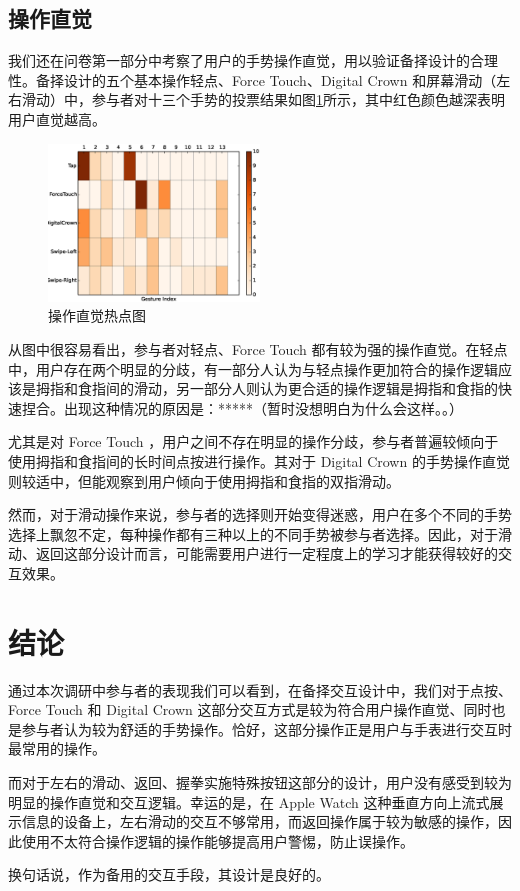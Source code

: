 \subsection{操作直觉}

我们还在问卷第一部分中考察了用户的手势操作直觉，用以验证备择设计的合理性。备择设计的五个基本操作轻点、Force Touch、Digital Crown 和屏幕滑动（左右滑动）中，参与者对十三个手势的投票结果如图\ref{fig:heat}所示，其中红色颜色越深表明用户直觉越高。

\begin{figure}[H]
    \kaishu
    \centering
    \includegraphics[width=0.5\textwidth]{figures/heat}
    \caption{\kaishu 操作直觉热点图}
    \label{fig:heat}
\end{figure}

从图中很容易看出，参与者对轻点、Force Touch 都有较为强的操作直觉。在轻点中，用户存在两个明显的分歧，有一部分人认为与轻点操作更加符合的操作逻辑应该是拇指和食指间的滑动，另一部分人则认为更合适的操作逻辑是拇指和食指的快速捏合。出现这种情况的原因是：*****（暂时没想明白为什么会这样。。）

尤其是对 Force Touch ，用户之间不存在明显的操作分歧，参与者普遍较倾向于使用拇指和食指间的长时间点按进行操作。其对于 Digital Crown 的手势操作直觉则较适中，但能观察到用户倾向于使用拇指和食指的双指滑动。

然而，对于滑动操作来说，参与者的选择则开始变得迷惑，用户在多个不同的手势选择上飘忽不定，每种操作都有三种以上的不同手势被参与者选择。因此，对于滑动、返回这部分设计而言，可能需要用户进行一定程度上的学习才能获得较好的交互效果。

\section{结论}

通过本次调研中参与者的表现我们可以看到，在备择交互设计中，我们对于点按、Force Touch 和 Digital Crown 这部分交互方式是较为符合用户操作直觉、同时也是参与者认为较为舒适的手势操作。恰好，这部分操作正是用户与手表进行交互时最常用的操作。

而对于左右的滑动、返回、握拳实施特殊按钮这部分的设计，用户没有感受到较为明显的操作直觉和交互逻辑。幸运的是，在 Apple Watch 这种垂直方向上流式展示信息的设备上，左右滑动的交互不够常用，而返回操作属于较为敏感的操作，因此使用不太符合操作逻辑的操作能够提高用户警惕，防止误操作。

换句话说，作为备用的交互手段，其设计是良好的。

\cleardoublepage
